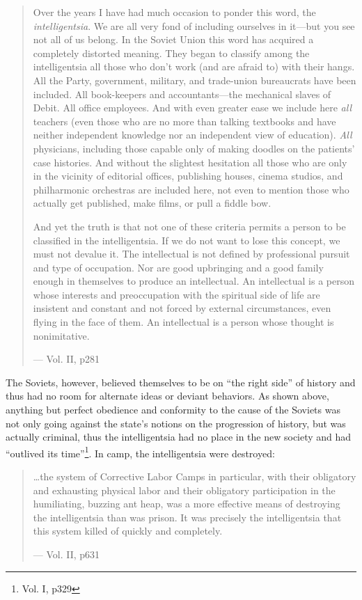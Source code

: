 \documentclass{article}
\begin{document}
\begin{quote}
Over the years I have had much occasion to ponder this word, the \emph{intelligentsia}.  We are all very fond of including ourselves in it---but you see not all of us belong.  In the Soviet Union this word has acquired a completely distorted meaning.  They began to classify among the intelligentsia all those who don't work (and are afraid to) with their hangs.  All the Party, government, military, and trade-union bureaucrats have been included.  All book-keepers and accountants---the mechanical slaves of Debit.  All office employees.  And with even greater ease we include here \emph{all} teachers (even those who are no more than talking textbooks and have neither independent knowledge nor an independent view of education).  \emph{All} physicians, including those capable only of making doodles on the patients' case histories.  And without the slightest hesitation all those who are only in the vicinity of editorial offices, publishing houses, cinema studios, and philharmonic orchestras are included here, not even to mention those who actually get published, make films, or pull a fiddle bow.

And yet the truth is that not one of these criteria permits a person to be classified in the intelligentsia.  If we do not want to lose this concept, we must not devalue it.  The intellectual is not defined by professional pursuit and type of occupation.  Nor are good upbringing and a good family enough in themselves to produce an intellectual.  An intellectual is a person whose interests and preoccupation with the spiritual side of life are insistent and constant and not forced by external circumstances, even flying in the face of them.  An intellectual is a person whose thought is nonimitative.

--- Vol. II, p281
\end{quote}

The Soviets, however, believed themselves to be on ``the right side'' of history and thus had no room for alternate ideas or deviant behaviors.  As shown above, anything but perfect obedience and conformity to the cause of the Soviets was not only going against the state's notions on the progression of history, but was actually criminal, thus the intelligentsia had no place in the new society and had ``outlived its time''\footnote{Vol. I, p329}.  In camp, the intelligentsia were destroyed:

\begin{quote}
\ldots the system of Corrective Labor Camps in particular, with their obligatory and exhausting physical labor and their obligatory participation in the humiliating, buzzing ant heap, was a more effective means of destroying the intelligentsia than was prison.  It was precisely the intelligentsia that this system killed of quickly and completely.

--- Vol. II, p631
\end{quote}
\end{document}
